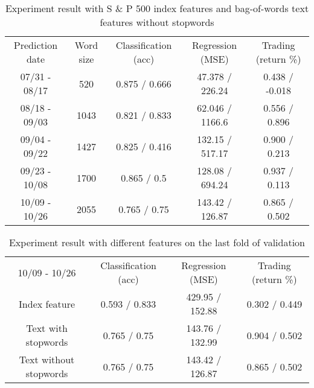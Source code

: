 \documentclass[sigconf]{acmart}
\begin{document}
\begin{table*}
\centering
\begin{tabular}{ccccc}
Prediction date & Word size & Classification (acc) & Regression (MSE) & Trading (return \%) \\
07/31 - 08/17   & 520       & 0.875 / 0.666        & 47.378 / 226.24  & 0.438 / -0.018      \\
08/18 - 09/03   & 1043      & 0.821 / 0.833        & 62.046 / 1166.6  & 0.556 / 0.896       \\
09/04 - 09/22   & 1427      & 0.825 / 0.416        & 132.15 / 517.17  & 0.900 / 0.213       \\
09/23 - 10/08   & 1700      & 0.865 / 0.5          & 128.08 / 694.24  & 0.937 / 0.113       \\
10/09 - 10/26   & 2055      & 0.765 / 0.75         & 143.42 / 126.87  & 0.865 / 0.502      
\end{tabular}
\caption{Experiment result with S \& P 500 index features and bag-of-words text features without stopwords}
\label{table:nostopwords}
\end{table*}

\begin{table*}
\centering
\begin{tabular}{cccc}
10/09 - 10/26          & Classification (acc) & Regression (MSE) & Trading (return \%) \\
Index feature          & 0.593 / 0.833        & 429.95 /  152.88 & 0.302 / 0.449       \\
Text with stopwords    & 0.765 / 0.75         & 143.76  / 132.99 & 0.904 / 0.502       \\
Text without stopwords & 0.765 / 0.75         & 143.42 / 126.87  & 0.865 / 0.502      
\end{tabular}
\caption{Experiment result with different features on the last fold of validation}
\label{table:compare}
\end{table*}
\end{document}
